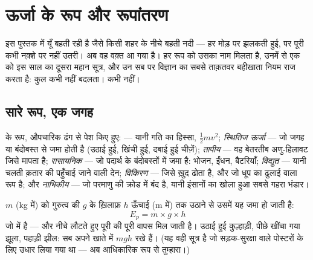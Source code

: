\chapter{ऊर्जा के रूप और रूपांतरण}\label{ch:g9:energy-conversions}

 इस पुस्तक में यूँ बहती रही है जैसे किसी शहर के नीचे बहती नदी ---
हर मोड़ पर झलकती हुई, पर पूरी कभी नक़्शे पर नहीं उतरी। अब वह वक़्त आ
गया है। हर रूप को उसका नाम मिलता है, उनमें से एक को इस साल का दूसरा
महान सूत्र, और उन सब पर विज्ञान का सबसे ताक़तवर बहीखाता नियम राज करता
है: कुल कभी नहीं बदलता। कभी नहीं।

\section{सारे रूप, एक जगह}

\begin{definition}[ऊर्जा के रूप]\label{def:g9:energy-conversions:forms}
 के रूप, औपचारिक ढंग से पेश किए हुए:
\emph{} --- यानी गति का हिस्सा, $\frac12 m v^2$;
\emph{स्थितिज ऊर्जा} --- जो जगह या बंदोबस्त से
जमा होती है (उठाई हुई, खिंची हुई, दबाई हुई चीज़ें); \emph{तापीय
} --- वह बेतरतीब अणु-हिलावट जिसे  मापता है;
\emph{रासायनिक } --- जो पदार्थ के बंदोबस्तों में जमा है: भोजन,
ईंधन, बैटरियाँ; \emph{विद्युत } --- यानी चलती क़तार की पहुँचाई
जाने वाली देन; \emph{विकिरण } --- जिसे ख़ुद  ढोता है, और जो
धूप का ढुलाई वाला रूप है; और \emph{नाभिकीय } --- जो परमाणु की
क्रोड में बंद है, यानी इंसानों का खोला हुआ सबसे गहरा भंडार।
\end{definition}

\begin{proposition}[गुरुत्वीय स्थितिज ऊर्जा]\label{prop:g9:energy-conversions:ep}
$m$  (\unit{kg} में) को गुरुत्व की $g$ के ख़िलाफ़ $h$ ऊँचाई
(\unit{m} में) तक उठाने से उसमें यह  जमा हो जाती है:
\[
E_p = m \times g \times h
\]
जो  में है --- और नीचे लौटते हुए पूरी की पूरी वापस मिल जाती है।
उठाई हुई कुल्हाड़ी, पीछे खींचा गया झूला, पहाड़ी झील: सब अपने खाते में
$m g h$ रखे हैं। (यह वही सूत्र है जो सड़क-सुरक्षा वाले पोस्टरों के लिए
उधार लिया गया था --- अब आधिकारिक रूप से तुम्हारा।)
\end{proposition}

